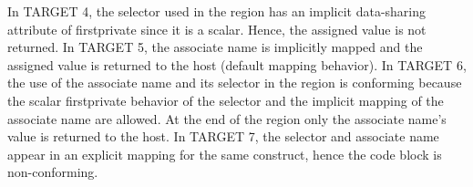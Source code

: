 In TARGET 4, the  selector used in the  region 
has an implicit data-sharing attribute of firstprivate since it is a scalar.
Hence, the assigned value is not returned.
In TARGET 5, the associate name  is implicitly mapped and the
assigned value is returned to the host (default  mapping behavior).
In TARGET 6, the use of the associate name and its selector in the 
region is conforming because the scalar firstprivate behavior of the selector 
and the implicit mapping of the associate name are allowed.  
At the end of the  region only the 
associate name's value is returned to the host. 
In TARGET 7, the selector and associate name appear in
an explicit mapping for the same  construct, 
hence the code block is non-conforming.

\fortranspecificend

